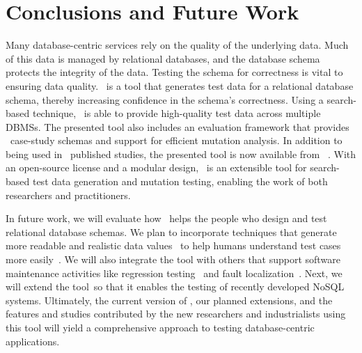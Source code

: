 
\section{Conclusions and Future Work}\label{sec:conclusion}


Many database-centric services rely on the quality of the underlying data. Much of this data is managed by relational
databases, and the database schema protects the integrity of the data. Testing the schema for correctness is vital to
ensuring data quality. \sa~is a tool that generates test data for a relational database schema, thereby increasing
confidence in the schema's correctness.  Using a search-based technique, \sa~is able to provide high-quality test data
across multiple DBMSs. The presented tool also includes an evaluation framework that provides
\numprovidedschemas~case-study schemas and support for efficient mutation analysis. In addition to being used in
\numuniquepapers~published studies, the presented tool is now available from \sawebsite~\cite{tool}. With an open-source
license and a modular design, \sa~is an extensible tool for search-based test data generation and mutation testing,
enabling the work of both researchers and practitioners.


In future work, we will evaluate how \sa~helps the people who design and test relational database schemas.  We plan to
incorporate techniques that generate more readable and realistic data
values~\cite{Afshan2013,McMinn2012,Shahbaz2012,Shahbaz2015} to help humans understand test cases more
easily~\cite{Fraser2015}.  We will also integrate the tool with others that support software maintenance
activities like regression testing~\cite{Kapfhammer2008} and fault localization~\cite{Clark2011}. Next, we will extend
the tool~so that it enables the testing of recently developed NoSQL systems. Ultimately, the current version of \sa, our
planned extensions, and the features and studies contributed by the new researchers and industrialists using this tool
will yield a comprehensive approach to testing database-centric applications.
